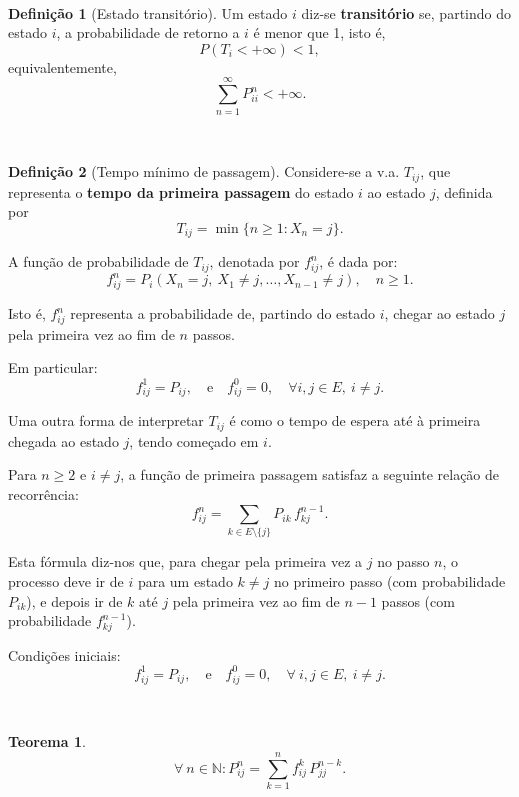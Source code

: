 \documentclass[
  11pt,
  a4paper,
]{book}
\newtheorem{theorem}{Teorema}[chapter]
\theoremstyle{definition}
\newtheorem{definition}{Definição}[chapter]
\theoremstyle{definition}
\theoremstyle{definition}
\theoremstyle{definition}
\theoremstyle{remark}
\begin{document}
\(\,\)

\begin{definition}[Estado transitório]
Um estado \(i\) diz-se \textbf{transitório} se, partindo do estado \(i\), a probabilidade de retorno a \(i\) é menor que 1, isto é,
\[
P(T_i < +\infty) < 1,
\]
equivalentemente,
\[
\sum_{n=1}^\infty P_{ii}^n < +\infty.
\]
\end{definition}

\(\,\)

\begin{definition}[Tempo mínimo de passagem]
Considere-se a v.a. \(T_{ij}\), que representa o \textbf{tempo da primeira passagem} do estado \(i\) ao estado \(j\), definida por
\[
T_{ij} = \min\{n \geq 1 : X_n = j\}.
\]

A função de probabilidade de \(T_{ij}\), denotada por \(f_{ij}^n\), é dada por:
\[
f_{ij}^n = P_i(X_n = j,~ X_1 \ne j, \ldots, X_{n-1} \ne j), \quad n \geq 1.
\]

Isto é, \(f_{ij}^n\) representa a probabilidade de, partindo do estado \(i\), chegar ao estado \(j\) pela primeira vez ao fim de \(n\) passos.

Em particular:
\[
f_{ij}^1 = P_{ij}, \quad \text{e} \quad f_{ij}^0 = 0, \quad \forall i, j \in E,~ i \neq j.
\]

Uma outra forma de interpretar \(T_{ij}\) é como o tempo de espera até à primeira chegada ao estado \(j\), tendo começado em \(i\).

Para \(n \geq 2\) e \(i \neq j\), a função de primeira passagem satisfaz a seguinte relação de recorrência:
\[
f_{ij}^n = \sum_{k \in E \setminus \{j\}} P_{ik} \, f_{kj}^{n-1}.
\]

Esta fórmula diz-nos que, para chegar pela primeira vez a \(j\) no passo \(n\), o processo deve ir de \(i\) para um estado \(k \neq j\) no primeiro passo (com probabilidade \(P_{ik}\)), e depois ir de \(k\) até \(j\) pela primeira vez ao fim de \(n-1\) passos (com probabilidade \(f_{kj}^{n-1}\)).

Condições iniciais:
\[
f_{ij}^1 = P_{ij}, \quad \text{e} \quad f_{ij}^0 = 0, \quad \forall~i,j \in E,~i \neq j.
\]
\end{definition}

\(\,\)

\begin{theorem}
\[\forall ~n \in \mathbb{N}: P_{ij}^n=\sum\limits_{k=1}^n f_{ij}^k \, P_{jj}^{n-k}.\]
\end{theorem}

\(\,\)
\end{document}
